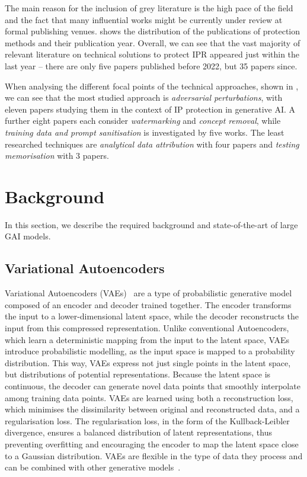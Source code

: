 \documentclass[conference,table]{IEEEtran}
\begin{document}
The main reason for the inclusion of grey literature is the high pace of the field and the fact that many influential works might be currently under review at formal publishing venues.
 shows the distribution of the publications of protection methods and their publication year. 
Overall, we can see that the vast majority of relevant literature on technical solutions to protect IPR appeared just within the last year -- there are only five papers published before 2022, but 35 papers since.

When analysing the different focal points of the technical approaches, shown in , we can see that the most studied approach is \textit{adversarial perturbations}, with eleven papers studying them in the context of IP protection in generative AI.
A further eight papers each consider \textit{watermarking} and \textit{concept removal}, while \textit{training data and prompt sanitisation} is investigated by five works.
The least researched techniques are \textit{analytical data attribution} with four papers and \textit{testing memorisation} with 3 papers.

\section{Background}\label{sec:background}
In this section, we describe the required background and state-of-the-art of large GAI models.

\subsection{Variational Autoencoders}
Variational Autoencoders (VAEs)~\cite{kingma_auto-encoding_2022} are a type of probabilistic generative model composed of an encoder and decoder trained together. The encoder transforms the input to a lower-dimensional latent space, while the decoder reconstructs the input from this compressed representation. Unlike conventional Autoencoders, which learn a deterministic mapping from the input to the latent space, VAEs introduce probabilistic modelling, as the input space is mapped to a probability distribution. This way, VAEs express not just single points in the latent space, but distributions of potential representations. Because the latent space is continuous, the decoder can generate novel data points that smoothly interpolate among training data points. 
VAEs are learned using both a reconstruction loss, which minimises the dissimilarity between original and reconstructed data, and a regularisation loss. The regularisation loss, in the form of the Kullback-Leibler divergence, ensures a balanced distribution of latent representations, thus preventing overfitting and encouraging the encoder to map the latent space close to a Gaussian distribution. 
VAEs are flexible in the type of data they process and can be combined with other generative models~\cite{bao_cvae-gan_2017, pandey_diffusevae_2022}.
\end{document}
